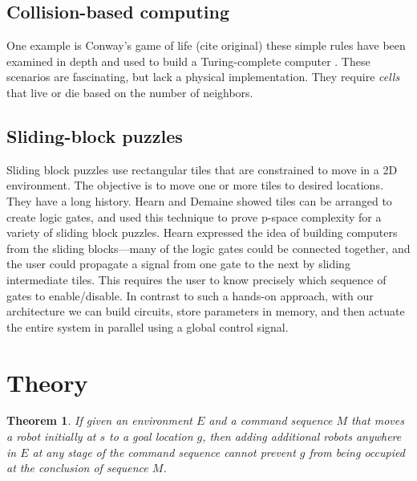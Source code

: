 \documentclass[letterpaper, 10 pt, conference]{ieeeconf}
\newcommand{\todo}[1]{\vspace{5 mm}\par \noindent \framebox{\begin{minipage}[c]{0.98 \columnwidth} \ttfamily\flushleft \textcolor{red}{#1}\end{minipage}}\vspace{5 mm}\par}
\newtheorem{theorem}{Theorem}
\begin{document}
\subsection{Collision-based computing} \todo{ refers to....   For a survey of this area, so the collection .... } %
One example is Conway's game of life (cite original)  these simple rules have been examined in depth and used  to build a Turing-complete computer \cite{Adamatzky2002}.  These scenarios are fascinating, but lack a physical implementation.  They require \emph{cells} that live or die based on the number of neighbors. 


\subsection{Sliding-block puzzles}
Sliding block puzzles use rectangular tiles that are constrained to move in a 2D environment. The objective is to move one or more tiles to desired locations. They have a long history.
Hearn \cite{hearn2005complexity} and Demaine \cite{Demaine2009} showed tiles can be arranged to create logic gates, and used this technique to prove {\sc p-space} complexity for a variety of sliding block puzzles.  Hearn expressed the idea of building computers from the sliding blocks---many of the logic gates could be connected together, and the user could propagate a signal from one gate to the next by sliding intermediate tiles.  This requires the user to know precisely which sequence of gates to enable/disable.  In contrast to such a hands-on approach, with our architecture we can build circuits, store parameters in memory, and then actuate the entire system in parallel using a global control signal.



\section{Theory}


\begin{theorem}\label{thm:AdditionalRobotsCannotPreventAnOccupation} %
If given an environment $E$ and a command sequence $M$ that moves a robot initially at $s$ to a goal location $g$, then adding additional robots anywhere in $E$ at any stage of the command sequence cannot prevent $g$ from being occupied at the conclusion of sequence $M$.
\end{theorem}
\end{document}
